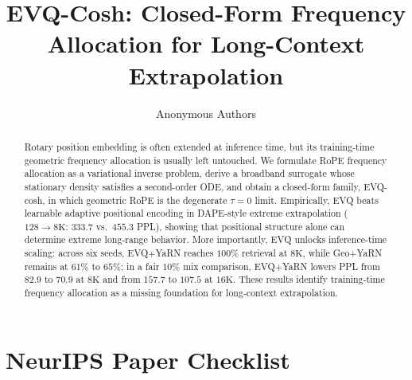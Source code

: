 \documentclass{article}
\title{EVQ-Cosh: Closed-Form Frequency Allocation for Long-Context Extrapolation}
\author{Anonymous Authors}
\begin{document}
\maketitle

\begin{abstract}
Rotary position embedding is often extended at inference time, but its training-time geometric frequency allocation is usually left untouched. We formulate RoPE frequency allocation as a variational inverse problem, derive a broadband surrogate whose stationary density satisfies a second-order ODE, and obtain a closed-form family, EVQ-cosh, in which geometric RoPE is the degenerate \(\tau=0\) limit. Empirically, EVQ beats learnable adaptive positional encoding in DAPE-style extreme extrapolation (\(128\!\rightarrow\!8\mathrm{K}\): \(333.7\) vs.\ \(455.3\) PPL), showing that positional structure alone can determine extreme long-range behavior. More importantly, EVQ unlocks inference-time scaling: across six seeds, EVQ+YaRN reaches \(100\%\) retrieval at \(8\mathrm{K}\), while Geo+YaRN remains at \(61\%\) to \(65\%\); in a fair \(10\%\) mix comparison, EVQ+YaRN lowers PPL from \(82.9\) to \(70.9\) at \(8\mathrm{K}\) and from \(157.7\) to \(107.5\) at \(16\mathrm{K}\). These results identify training-time frequency allocation as a missing foundation for long-context extrapolation.
\end{abstract}












\section*{NeurIPS Paper Checklist}
\end{document}
